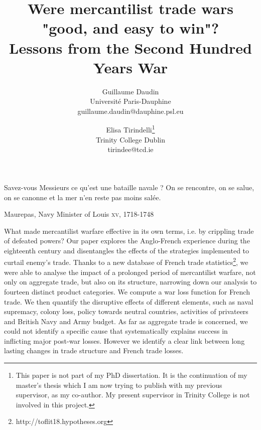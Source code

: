 \documentclass[12pt,a4paper,notitlepage]{article}
\begin{document}
\title{Were mercantilist trade wars "good, and easy to win"? \\
Lessons from the Second Hundred Years War}
\author{
  Guillaume Daudin \\ Université Paris-Dauphine \\guillaume.daudin@dauphine.psl.eu		
  \and
  Elisa Tirindelli\footnote{This paper is not part of my PhD dissertation. It is the continuation of my master's thesis which I am now trying to publish with my previous supervisor, as my co-author. My present supervisor in Trinity College is not involved in this project.} \\ Trinity College Dublin  \\ tirindee@tcd.ie
}
\date{}
\maketitle


\epigraph{Savez-vous Messieurs ce qu’est une bataille navale ? On se rencontre, on se salue, on se canonne et la mer n’en reste pas moins salée.}{Maurepas, Navy Minister of Louis  \textsc{xv}, 1718-1748}

What made mercantilist warfare effective in its own terms, i.e. by crippling trade of defeated powers?
Our paper explores the Anglo-French experience during the eighteenth century and disentangles the effects of the strategies implemented to curtail enemy's trade.
Thanks to a new database of French trade statistics\footnote{http://toflit18.hypotheses.org}, we were able to analyse the impact of a prolonged period of mercantilist warfare, not only on aggregate trade, but also on its structure, narrowing down our analysis to fourteen distinct product categories.
We compute a war loss function for French trade.
We then quantify the disruptive effects of different elements, such as naval supremacy, colony loss, policy towards neutral countries, activities of privateers and British Navy and Army budget.
As far as aggregate trade is concerned, we could not identify a specific cause that systematically explains success in inflicting major post-war losses.
However we identify a clear link between long lasting changes in trade structure and French trade losses. \\
\end{document}
